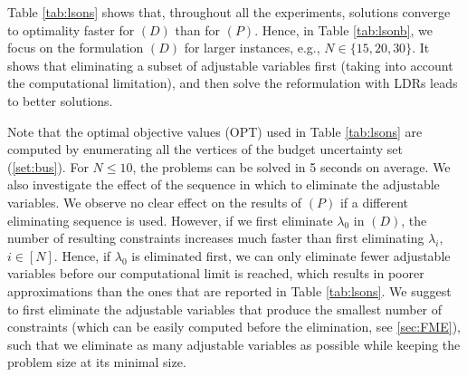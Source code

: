 \documentclass[fleqn,mnsc,blindrev]{informs4}
\begin{document}
		
		Table \ref{tab:lsons} shows that, throughout all the experiments, solutions converge to optimality faster for $(D)$ than for $(P)$. Hence, in Table \ref{tab:lsonb}, we focus on the formulation $(D)$ for larger instances, e.g., $N\in \{15, 20,30 \}$. It shows that eliminating a subset of adjustable variables first (taking into account the computational limitation), and then solve the reformulation with LDRs leads to better solutions.
		
 {	Note that the optimal objective values (OPT) used in Table \ref{tab:lsons} are computed by enumerating all the vertices of the budget uncertainty set (\ref{set:bus}). For $N \le10 $, the problems can be solved in 5 seconds on average. We also investigate the effect of the sequence in which to eliminate the adjustable variables. We observe no clear effect on the results of $(P)$ if a different eliminating sequence is used. However, if we first eliminate $\lambda_0$ in $(D)$, the number of resulting constraints increases much faster than first eliminating  $\lambda_i$, $i\in [N]$. Hence, if $\lambda_0$ is eliminated first, we can only eliminate fewer adjustable variables before our computational limit is reached, which results in poorer approximations than the ones that are reported in Table \ref{tab:lsons}. We suggest to first eliminate the adjustable variables that produce the smallest number of constraints (which can be easily computed before the elimination, see \textsection \ref{sec:FME}), such that we eliminate as many adjustable variables as possible while keeping the problem size at its minimal size. }
		
\end{document}
